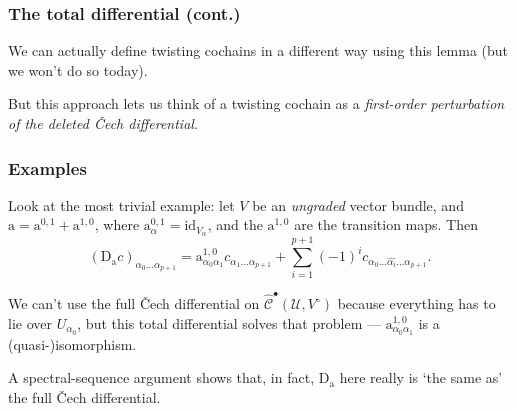 \documentclass{beamer}
\begin{document}
        \begin{frame}\frametitle{The total differential (cont.)}
            We can actually define twisting cochains in a different way using this lemma (but we won't do so today).

            \pause

            But this approach lets us think of a twisting cochain as a \emph{first-order perturbation of the deleted Čech differential}.
        \end{frame}

        \begin{frame}\frametitle{Examples}
            \begin{example}
                Look at the most trivial example: let $V$ be an \emph{ungraded} vector bundle, and $\mathrm{a} = \mathrm{a}^{0,1}+\mathrm{a}^{1,0}$, where $\mathrm{a}_{\alpha}^{0,1} = \mathrm{id}_{V_\alpha}$, and the $\mathrm{a}^{1,0}$ are the transition maps.
                Then
                \begin{equation*}
                    (\mathrm{D}_\mathrm{a}c)_{\alpha_0\ldots\alpha_{p+1}} = \mathrm{a}_{\alpha_0\alpha_1}^{1,0}c_{\alpha_1\ldots\alpha_{p+1}} + \sum_{i=1}^{p+1}(-1)^i c_{\alpha_0\ldots\widehat{\alpha_i}\ldots\alpha_{p+1}}.
                \end{equation*}

                \pause

                We can't use the full Čech differential on $\hat{\mathscr{C}}^\bullet(\mathcal{U},V^\circ)$ because everything has to lie over $U_{\alpha_0}$, but this total differential solves that problem --- $\mathrm{a}_{\alpha_0\alpha_1}^{1,0}$ is a (quasi-)isomorphism.

                \pause

                A spectral-sequence argument shows that, in fact, $\mathrm{D}_\mathrm{a}$ here really is `the same as' the full Čech differential.
            \end{example}
        \end{frame}
\end{document}
